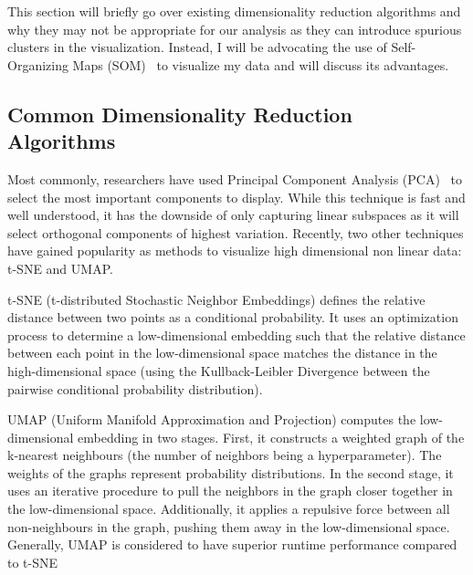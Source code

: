 This section will briefly go over existing dimensionality reduction algorithms and why they may not be appropriate for our analysis as they can introduce spurious clusters in the visualization. Instead, I will be advocating the use of Self-Organizing Maps (SOM)~\cite{kohonen1990self}  to visualize my data and will discuss its advantages.


\subsection*{Common Dimensionality Reduction Algorithms}

Most commonly, researchers have used Principal Component Analysis (PCA)~ to select the most important components to display. While this technique is fast and well understood, it has the downside of only capturing linear subspaces as it will select orthogonal components of highest variation. Recently, two other techniques have gained popularity as methods to visualize high dimensional non linear data: t-SNE and UMAP.  


t-SNE (t-distributed Stochastic Neighbor Embeddings) defines the relative distance between two points as a conditional probability. It uses an optimization process to determine a low-dimensional embedding such that the relative distance between each point in the low-dimensional space matches the distance in the high-dimensional space (using the Kullback-Leibler Divergence between the pairwise conditional probability distribution).

UMAP (Uniform Manifold Approximation and Projection) computes the low-dimensional embedding in two stages. First, it constructs a weighted graph of the k-nearest neighbours (the number of neighbors being a hyperparameter). The weights of the graphs represent probability distributions. In the second stage, it uses an iterative procedure to pull the neighbors in the graph closer together in the low-dimensional space. Additionally, it applies a repulsive force between all non-neighbours in the graph, pushing them away in the low-dimensional space. Generally, UMAP is considered to have superior runtime performance compared to t-SNE~\cite{mcinnes2020umap}

